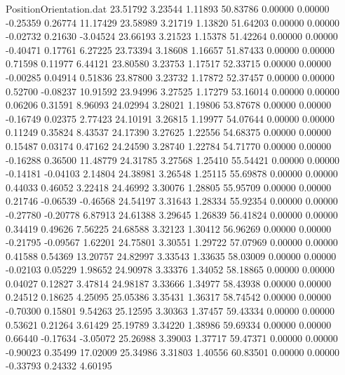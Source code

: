 \begin{filecontents}{PositionOrientation.dat}
  23.51792    3.23544    1.11893    50.83786    0.00000    0.00000   -0.25359    0.26774   11.17429
  23.58989    3.21719    1.13820    51.64203    0.00000    0.00000   -0.02732    0.21630   -3.04524
  23.66193    3.21523    1.15378    51.42264    0.00000    0.00000   -0.40471    0.17761    6.27225
  23.73394    3.18608    1.16657    51.87433    0.00000    0.00000    0.71598    0.11977    6.44121
  23.80580    3.23753    1.17517    52.33715    0.00000    0.00000   -0.00285    0.04914    0.51836
  23.87800    3.23732    1.17872    52.37457    0.00000    0.00000    0.52700   -0.08237   10.91592
  23.94996    3.27525    1.17279    53.16014    0.00000    0.00000    0.06206    0.31591    8.96093
  24.02994    3.28021    1.19806    53.87678    0.00000    0.00000   -0.16749    0.02375    2.77423
  24.10191    3.26815    1.19977    54.07644    0.00000    0.00000    0.11249    0.35824    8.43537
  24.17390    3.27625    1.22556    54.68375    0.00000    0.00000    0.15487    0.03174    0.47162
  24.24590    3.28740    1.22784    54.71770    0.00000    0.00000   -0.16288    0.36500   11.48779
  24.31785    3.27568    1.25410    55.54421    0.00000    0.00000   -0.14181   -0.04103    2.14804
  24.38981    3.26548    1.25115    55.69878    0.00000    0.00000    0.44033    0.46052    3.22418
  24.46992    3.30076    1.28805    55.95709    0.00000    0.00000    0.21746   -0.06539   -0.46568
  24.54197    3.31643    1.28334    55.92354    0.00000    0.00000   -0.27780   -0.20778    6.87913
  24.61388    3.29645    1.26839    56.41824    0.00000    0.00000    0.34419    0.49626    7.56225
  24.68588    3.32123    1.30412    56.96269    0.00000    0.00000   -0.21795   -0.09567    1.62201
  24.75801    3.30551    1.29722    57.07969    0.00000    0.00000    0.41588    0.54369   13.20757
  24.82997    3.33543    1.33635    58.03009    0.00000    0.00000   -0.02103    0.05229    1.98652
  24.90978    3.33376    1.34052    58.18865    0.00000    0.00000    0.04027    0.12827    3.47814
  24.98187    3.33666    1.34977    58.43938    0.00000    0.00000    0.24512    0.18625    4.25095
  25.05386    3.35431    1.36317    58.74542    0.00000    0.00000   -0.70300    0.15801    9.54263
  25.12595    3.30363    1.37457    59.43334    0.00000    0.00000    0.53621    0.21264    3.61429
  25.19789    3.34220    1.38986    59.69334    0.00000    0.00000    0.66440   -0.17634   -3.05072
  25.26988    3.39003    1.37717    59.47371    0.00000    0.00000   -0.90023    0.35499   17.02009
  25.34986    3.31803    1.40556    60.83501    0.00000    0.00000   -0.33793    0.24332    4.60195

\end{filecontents}
